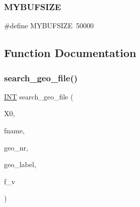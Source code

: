 \subsubsection{\texorpdfstring{M\+Y\+B\+U\+F\+S\+I\+ZE}{MYBUFSIZE}}
{\footnotesize\ttfamily \#define M\+Y\+B\+U\+F\+S\+I\+ZE~50000}



\subsection{Function Documentation}
\mbox{\label{geometry_8_c_a11af609febe3a9db20d8236af36928c5}} 
\subsubsection{\texorpdfstring{search\+\_\+geo\+\_\+file()}{search\_geo\_file()}}
{\footnotesize\ttfamily \mbox{\hyperlink{galois_8h_a09fddde158a3a20bd2dcadb609de11dc}{I\+NT}} search\+\_\+geo\+\_\+file (\begin{DoxyParamCaption}\item[{\mbox{\hyperlink{classmatrix}{matrix}} \&}]{X0,  }\item[{\mbox{\hyperlink{galois_8h_ab6cc7b4aeb6ea31aba2b3fbfc83ff5e6}{B\+Y\+TE}} $\ast$}]{fname,  }\item[{\mbox{\hyperlink{galois_8h_a09fddde158a3a20bd2dcadb609de11dc}{I\+NT}}}]{geo\+\_\+nr,  }\item[{\mbox{\hyperlink{galois_8h_ab6cc7b4aeb6ea31aba2b3fbfc83ff5e6}{B\+Y\+TE}} $\ast$}]{geo\+\_\+label,  }\item[{\mbox{\hyperlink{galois_8h_a09fddde158a3a20bd2dcadb609de11dc}{I\+NT}}}]{f\+\_\+v }\end{DoxyParamCaption})}

